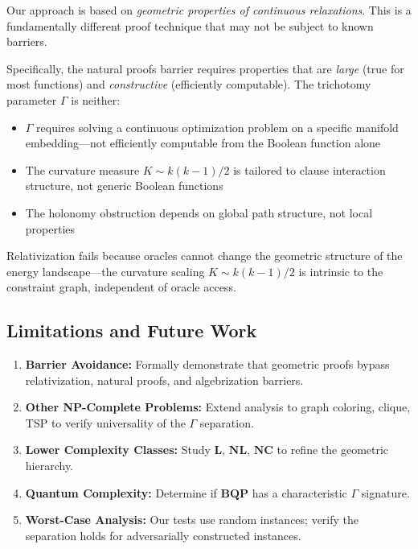 \documentclass[11pt,a4paper]{article}
\theoremstyle{plain}
\theoremstyle{definition}
\theoremstyle{remark}
\begin{document}
Our approach is based on \emph{geometric properties of continuous relaxations}. This is a fundamentally different proof technique that may not be subject to known barriers.

Specifically, the natural proofs barrier \cite{razborov1997} requires properties that are \emph{large} (true for most functions) and \emph{constructive} (efficiently computable). The trichotomy parameter $\Gamma$ is neither:
\begin{itemize}
    \item $\Gamma$ requires solving a continuous optimization problem on a specific manifold embedding---not efficiently computable from the Boolean function alone
    \item The curvature measure $K \sim k(k-1)/2$ is tailored to clause interaction structure, not generic Boolean functions
    \item The holonomy obstruction depends on global path structure, not local properties
\end{itemize}

Relativization fails because oracles cannot change the geometric structure of the energy landscape---the curvature scaling $K \sim k(k-1)/2$ is intrinsic to the constraint graph, independent of oracle access.

\subsection{Limitations and Future Work}

\begin{enumerate}
    \item \textbf{Barrier Avoidance:} Formally demonstrate that geometric proofs bypass relativization, natural proofs, and algebrization barriers.
    
    \item \textbf{Other NP-Complete Problems:} Extend analysis to graph coloring, clique, TSP to verify universality of the $\Gamma$ separation.
    
    \item \textbf{Lower Complexity Classes:} Study $\textbf{L}$, $\textbf{NL}$, $\textbf{NC}$ to refine the geometric hierarchy.
    
    \item \textbf{Quantum Complexity:} Determine if $\textbf{BQP}$ has a characteristic $\Gamma$ signature.
    
    \item \textbf{Worst-Case Analysis:} Our tests use random instances; verify the separation holds for adversarially constructed instances.
\end{enumerate}
\end{document}
